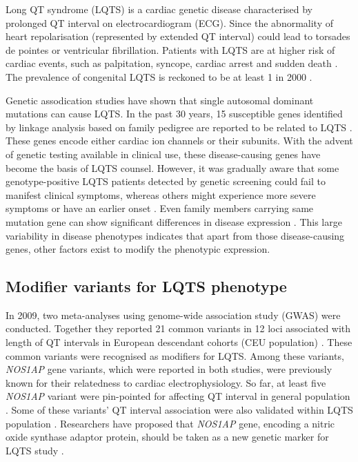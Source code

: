 \documentclass[a4paper,12pt,oneside]{extarticle}
\begin{document}
Long QT syndrome (LQTS) is a cardiac genetic disease characterised by prolonged QT interval on electrocardiogram (ECG). Since the abnormality of heart repolarisation (represented by extended QT interval) could lead to torsades de pointes or ventricular fibrillation. Patients with LQTS are at higher risk of cardiac events, such as palpitation, syncope, cardiac arrest and sudden death \cite{2}. The prevalence of congenital LQTS is reckoned to be at least 1 in 2000 \cite{1}. 
\par
Genetic assodication studies have shown that single autosomal dominant mutations can cause LQTS. In the past 30 years, 15 susceptible genes identified by linkage analysis based on family pedigree are reported to be related to LQTS \cite{2}. These genes encode either cardiac ion channels or their subunits. With the advent of genetic testing available in clinical use, these disease-causing genes have become the basis of LQTS counsel. However, it was gradually aware that some genotype-positive LQTS patients detected by genetic screening could fail to manifest clinical symptoms, whereas others might experience more severe symptoms or have an earlier onset \cite{3}. Even family members carrying same mutation gene can show significant differences in disease expression \cite{3}. This large variability in disease phenotypes indicates that apart from those disease-causing genes, other factors exist to modify the phenotypic expression.

\subsection{Modifier variants for LQTS phenotype}
In 2009, two meta-analyses using genome-wide association study (GWAS) were conducted. Together they reported 21 common variants in 12 loci associated with length of QT intervals in European descendant cohorts (CEU population) \cite{4,5}. These common variants were recognised as modifiers for LQTS. Among these variants, \textit{NOS1AP} gene variants, which were reported in both studies, were previously known for their relatedness to cardiac electrophysiology. So far, at least five \textit{NOS1AP} variant were pin-pointed for affecting QT interval in general population \cite{6,7,40}. Some of these variants’ QT interval association were also validated within LQTS population \cite{8}. Researchers have proposed that \textit{NOS1AP} gene, encoding a nitric oxide synthase adaptor protein, should be taken as a new genetic marker for LQTS study \cite{8}. 
\end{document}
